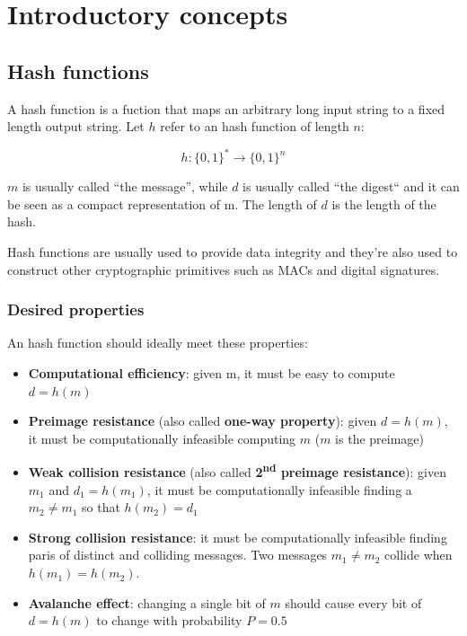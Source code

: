\section{Introductory concepts}

\subsection{Hash functions}
A hash function is a fuction that maps an arbitrary long input string to a fixed
length output string. Let $h$ refer to an hash function of length $n$:

\[
  h\colon \{0,1\}^* \to \{0,1\}^n
\]

$m$ is usually called ``the message'', while $d$ is usually called ``the digest``
and it can be seen as a compact representation of m. The length of $d$ is the
length of the hash.

Hash functions are usually used to provide data integrity and they're also used to
construct other cryptographic primitives such as MACs and digital signatures.

\subsubsection{Desired properties}
An hash function should ideally meet these properties:
\begin{itemize}
  \item \textbf{Computational efficiency}: given m, it must be easy to compute ${d=h(m)}$
  \item \textbf{Preimage resistance} (also called \textbf{one-way property}):
  given ${d=h(m)}$, it must be computationally infeasible computing $m$ ($m$ is the
  preimage)
  \item \textbf{Weak collision resistance} (also called
  \textbf{2\textsuperscript{nd} preimage resistance}): given $m_1$ and ${d_1=h(m_1)}$,
  it must be computationally infeasible finding a $m_2 \neq m_1$ so that ${h(m_2)=d_1}$
  \item \textbf{Strong collision resistance}: it must be computationally infeasible
  finding paris of distinct and colliding messages. Two messages $m_1\neq m_2$
  collide when ${h(m_1)=h(m_2)}$.
  \item \textbf{Avalanche effect}: changing a single bit of $m$ should cause every
  bit of ${d=h(m)}$ to change with probability ${P=0.5}$
\end{itemize}

